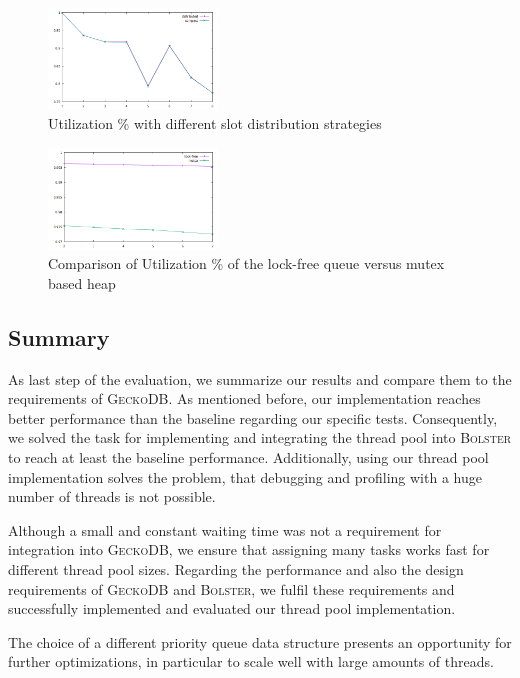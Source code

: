 \documentclass[conference]{IEEEtran}
\begin{document}
\begin{figure}
	\centering\includegraphics[width=0.4\textwidth]{img/slot_distr.png}
	\caption{Utilization \% with different slot distribution strategies}
	\label{fig8}
\end{figure}

\begin{figure}
	\centering\includegraphics[width=0.4\textwidth]{img/lock_free.png}
	\caption{Comparison of Utilization \% of the lock-free queue versus mutex based heap}
	\label{fig9}
\end{figure}

\subsection{Summary}
As last step of the evaluation, we summarize our results and compare them to the requirements of \textsc{GeckoDB}. As mentioned before, our implementation reaches better performance than the baseline regarding our specific tests. Consequently, we solved the task for implementing and integrating the thread pool into \textsc{Bolster} to reach at least the baseline performance. Additionally, using our thread pool implementation solves the problem, that debugging and profiling with a huge number of threads is not possible. 

Although a small and constant waiting time was not a requirement for integration into \textsc{GeckoDB}, we ensure that assigning many tasks works fast for different thread pool sizes. Regarding the performance and also the design requirements of \textsc{GeckoDB} and \textsc{Bolster}, we fulfil these requirements and successfully implemented and evaluated our thread pool implementation.

The choice of a different priority queue data structure presents an opportunity for further optimizations, in particular to scale well with large amounts of threads.
\end{document}
